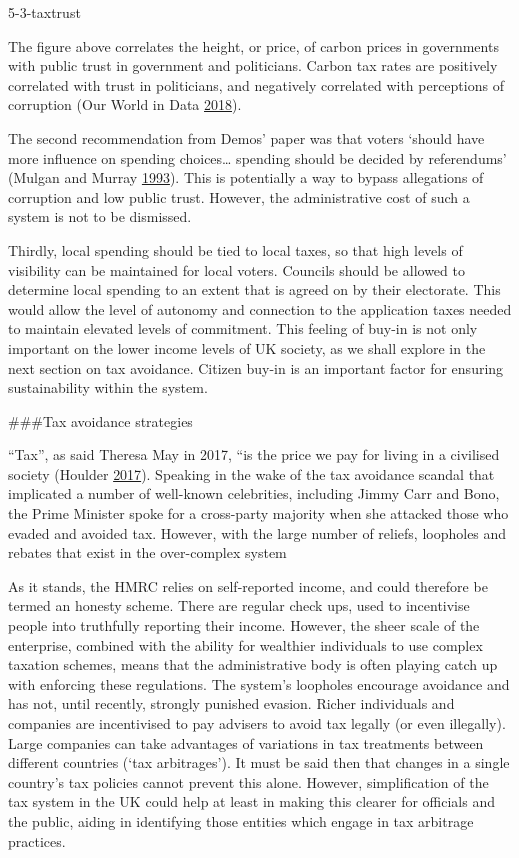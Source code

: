 \documentclass[]{article}
\begin{document}
{5-3-taxtrust}

The figure above correlates the height, or price, of carbon prices in
governments with public trust in government and politicians. Carbon tax
rates are positively correlated with trust in politicians, and
negatively correlated with perceptions of corruption (Our World in Data
\protect\hyperlink{ref-OurWorldinData2018}{2018}).

The second recommendation from Demos' paper was that voters `should have
more influence on spending choices\ldots{} spending should be decided by
referendums' (Mulgan and Murray
\protect\hyperlink{ref-Mulgan1993}{1993}). This is potentially a way to
bypass allegations of corruption and low public trust. However, the
administrative cost of such a system is not to be dismissed.

Thirdly, local spending should be tied to local taxes, so that high
levels of visibility can be maintained for local voters. Councils should
be allowed to determine local spending to an extent that is agreed on by
their electorate. This would allow the level of autonomy and connection
to the application taxes needed to maintain elevated levels of
commitment. This feeling of buy-in is not only important on the lower
income levels of UK society, as we shall explore in the next section on
tax avoidance. Citizen buy-in is an important factor for ensuring
sustainability within the system.

\#\#\#Tax avoidance strategies

``Tax'', as said Theresa May in 2017, ``is the price we pay for living
in a civilised society (Houlder
\protect\hyperlink{ref-Houlder2017}{2017}). Speaking in the wake of the
tax avoidance scandal that implicated a number of well-known
celebrities, including Jimmy Carr and Bono, the Prime Minister spoke for
a cross-party majority when she attacked those who evaded and avoided
tax. However, with the large number of reliefs, loopholes and rebates
that exist in the over-complex system

As it stands, the HMRC relies on self-reported income, and could
therefore be termed an honesty scheme. There are regular check ups, used
to incentivise people into truthfully reporting their income. However,
the sheer scale of the enterprise, combined with the ability for
wealthier individuals to use complex taxation schemes, means that the
administrative body is often playing catch up with enforcing these
regulations. The system's loopholes encourage avoidance and has not,
until recently, strongly punished evasion. Richer individuals and
companies are incentivised to pay advisers to avoid tax legally (or even
illegally). Large companies can take advantages of variations in tax
treatments between different countries (`tax arbitrages'). It must be
said then that changes in a single country's tax policies cannot prevent
this alone. However, simplification of the tax system in the UK could
help at least in making this clearer for officials and the public,
aiding in identifying those entities which engage in tax arbitrage
practices.
\end{document}
